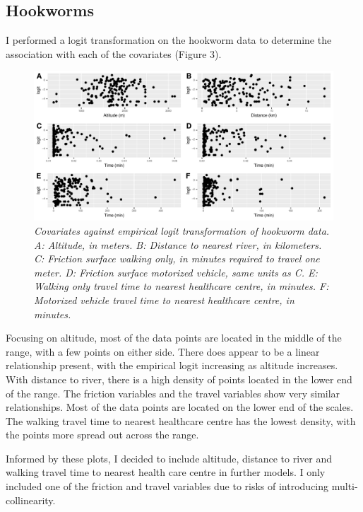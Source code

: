 \documentclass[
]{article}
\begin{document}
\hypertarget{hookworms}{%
\subsection{Hookworms}\label{hookworms}}

I performed a logit transformation on the hookworm data to determine the
association with each of the covariates (Figure 3).

\begin{figure}
\centering
\includegraphics{write_up_files/figure-latex/HK_e.logit-1.pdf}
\caption{\textit{Covariates against empirical logit transformation of hookworm data. A: Altitude, in meters. B: Distance to nearest river, in kilometers. C: Friction surface walking only, in minutes required to travel one meter. D: Friction surface motorized vehicle, same units as C. E: Walking only travel time to nearest healthcare centre, in minutes. F: Motorized vehicle travel time to nearest healthcare centre, in minutes.}}
\end{figure}

Focusing on altitude, most of the data points are located in the middle
of the range, with a few points on either side. There does appear to be
a linear relationship present, with the empirical logit increasing as
altitude increases. With distance to river, there is a high density of
points located in the lower end of the range. The friction variables and
the travel variables show very similar relationships. Most of the data
points are located on the lower end of the scales. The walking travel
time to nearest healthcare centre has the lowest density, with the
points more spread out across the range.

Informed by these plots, I decided to include altitude, distance to
river and walking travel time to nearest health care centre in further
models. I only included one of the friction and travel variables due to
risks of introducing multi-collinearity.
\end{document}
